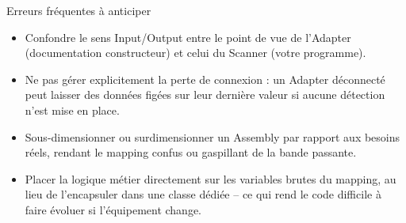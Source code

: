 \begin{UPSTIinfor}{Erreurs fréquentes à anticiper}
    \begin{itemize}
        \item Confondre le sens Input/Output entre le point de vue de l'Adapter (documentation constructeur) et celui du Scanner (votre programme).
        \item Ne pas gérer explicitement la perte de connexion : un Adapter déconnecté peut laisser des données figées sur leur dernière valeur si aucune détection n'est mise en place.
        \item Sous-dimensionner ou surdimensionner un Assembly par rapport aux besoins réels, rendant le mapping confus ou gaspillant de la bande passante.
        \item Placer la logique métier directement sur les variables brutes du mapping, au lieu de l'encapsuler dans une classe dédiée -- ce qui rend le code difficile à faire évoluer si l'équipement change.
    \end{itemize}
\end{UPSTIinfor}
